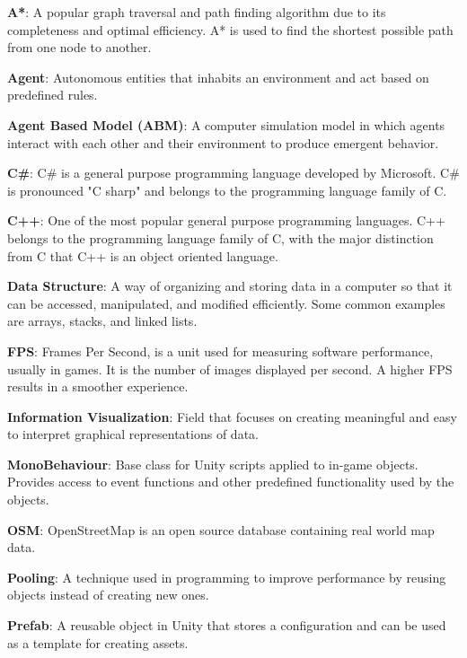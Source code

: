 \noindent
\label{itm:a*}\textbf{A*}: A popular graph traversal and path finding algorithm due to its completeness and optimal efficiency. A* is used to find the shortest possible path from one node to another.

\noindent
\label{itm:agent}\textbf{Agent}: Autonomous entities that inhabits an environment and act based on predefined rules.

\noindent
\label{itm:abm}\textbf{Agent Based Model (ABM)}: A computer simulation model in which agents interact with each other and their environment to produce emergent behavior. 

\noindent
\label{itm:csharp}\textbf{C\#}: C\# is a general purpose programming language developed by Microsoft. C\# is pronounced "C sharp" and belongs to the programming language family of C.

\noindent
\label{itm:c++}\textbf{C++}: One of the most popular general purpose programming languages. C++ belongs to the programming language family of C, with the major distinction from C that C++ is an object oriented language.

\noindent
\label{itm:data-structure}\textbf{Data Structure}: A way of organizing and storing data in a computer so that it can be accessed, manipulated, and modified efficiently. Some common examples are arrays, stacks, and linked lists.

\noindent
\label{itm:fps}\textbf{FPS}: Frames Per Second, is a unit used for measuring software performance, usually in games. It is the number of images displayed per second. A higher FPS results in a smoother experience.

\noindent
\label{itm:information-visualization}\textbf{Information Visualization}: Field that focuses on creating meaningful and easy to interpret graphical representations of data.

\noindent
\label{itm:monobehaviour}\textbf{MonoBehaviour}: Base class for Unity scripts applied to in-game objects. Provides access to event functions and other predefined functionality used by the objects.

\noindent
\label{itm:open-street-map}\textbf{OSM}: OpenStreetMap is an open source database containing real world map data.

\noindent
\label{itm:pooling}\textbf{Pooling}: A technique used in programming to improve performance by reusing objects instead of creating new ones. 

\noindent
\label{itm:prefab}\textbf{Prefab}: A reusable object in Unity that stores a configuration and can be used as a template for creating assets.

